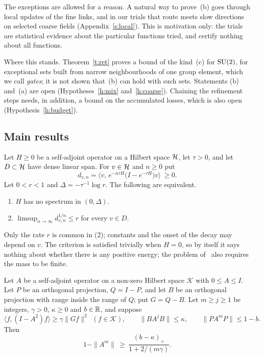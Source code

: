 The exceptions are allowed for a reason. A natural way to prove~(b) goes through local updates of the fine
links, and in our trials that route meets slow directions on selected coarse fields (Appendix~\ref{s:local}).
This is motivation only: the trials are statistical evidence about the particular functions tried, and
certify nothing about all functions.

Where this stands. Theorem~\ref{t:ret} proves a bound of the kind~(c) for $\mathrm{SU}(2)$, for exceptional sets
built from narrow neighbourhoods of one group element, which we call \emph{gates}; it is not shown that~(b)
can hold with such sets. Statements (b) and~(a) are open (Hypotheses~\ref{h:mix} and~\ref{h:coarse}).
Chaining the refinement steps needs, in addition, a bound on the accumulated losses, which is also open
(Hypothesis~\ref{h:budget}).

\subsection{Main results}
\begin{theorem}\label{t:crit}
Let $H\ge0$ be a self-adjoint operator on a Hilbert space $\mathcal{H}$, let $\tau>0$, and let $D\subset\mathcal{H}$ have dense
linear span. For $v\in\mathcal{H}$ and $n\ge0$ put
\[
d_{v,n}=\big\langle v,\,e^{-n\tau H}\big(I-e^{-\tau H}\big)v\big\rangle\ \ge0 .
\]
Let $0<r<1$ and $\Delta=-\tau^{-1}\log r$. The following are equivalent.
\begin{enumerate}
\item $H$ has no spectrum in $(0,\Delta)$.
\item $\limsup_{n\to\infty}d_{v,n}^{1/n}\le r$ for every $v\in D$.
\end{enumerate}
\end{theorem}

Only the rate $r$ is common in (2); constants and the onset of the decay may depend on $v$. The criterion is
satisfied trivially when $H=0$, so by itself it says nothing about whether there is any positive energy; the
problem of~\cite{JW} also requires the mass to be finite.

\begin{theorem}\label{t:inh}
Let $A$ be a self-adjoint operator on a non-zero Hilbert space $\mathcal K$ with $0\le A\le I$. Let $P$ be an
orthogonal projection, $Q=I-P$, and let $B$ be an orthogonal projection with range inside the range of $Q$;
put $G=Q-B$. Let $m\ge j\ge1$ be integers, $\gamma>0$, $\kappa\ge0$ and $b\in\mathbb{R}$, and suppose
\begin{equation}\label{e:hyp}
\langle f,(I-A^{2})f\rangle\ge\gamma\|Gf\|^2\ \ (f\in\mathcal K),\qquad
\|BA^{j}B\|\le\kappa,\qquad \|PA^{m}P\|\le1-b .
\end{equation}
Then
\begin{equation}\label{e:inh}
1-\|A^m\|\ \ge\ \frac{(b-\kappa)_+}{1+2/(m\gamma)} .
\end{equation}
\end{theorem}

